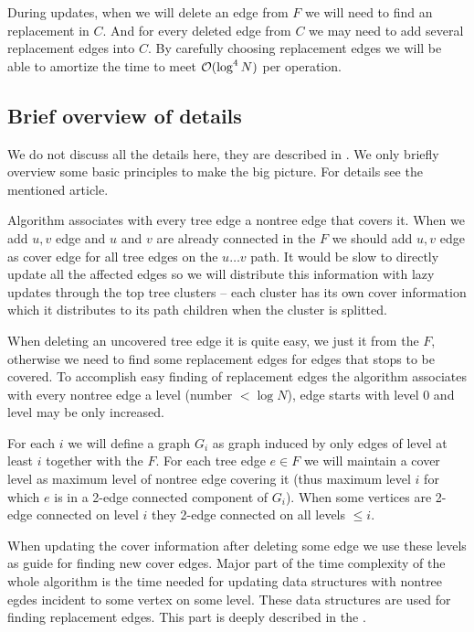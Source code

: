 During updates, when we will delete an edge from $F$ we will need to find an
replacement in $C$. And for every deleted edge from $C$ we may need to add
several replacement edges into $C$. By carefully choosing replacement
edges we will be able to amortize the time to meet ${\cal O}(\log^4 N)$ per operation.

\subsection{Brief overview of details}

We do not discuss all the details here, they are described in \cite{PolylogarithmicAlgorithmsForConnectivity}. We only briefly overview some basic
principles to make the big picture. For details see the mentioned article.

Algorithm associates with every tree edge a nontree edge that covers it. When we
add $u,v$ edge and $u$ and $v$ are already connected in the $F$ we should add
$u,v$ edge as cover edge for all tree edges on the $u\dots v$ path. It would be
slow to directly update all the affected edges so we will distribute this
information with lazy updates through the top tree clusters -- each cluster has
its own cover information which it distributes to its path children when the
cluster is splitted.

When deleting an uncovered tree edge it is quite easy, we just \Cut{} it from
the $F$, otherwise we need to find some replacement edges for edges that stops
to be covered. To accomplish easy finding of replacement edges the algorithm
associates with every nontree edge a level (number $< \log N$), edge starts with
level 0 and level may be only increased.

For each $i$ we will define a graph $G_i$ as graph induced by only edges of
level at least $i$ together with the $F$. For each tree edge $e \in F$ we will
maintain a cover level as maximum level of nontree edge covering it (thus
maximum level $i$ for which $e$ is in a 2-edge connected component of $G_i$).
When some vertices are 2-edge connected on level $i$ they 2-edge connected on
all levels $\le i$.

When updating the cover information after deleting some edge we use these levels
as guide for finding new cover edges. Major part of the time complexity of the
whole algorithm is the time needed for updating data structures with nontree
egdes incident to some vertex on some level. These data structures are used for
finding replacement edges. This part is deeply described in the \cite{PolylogarithmicAlgorithmsForConnectivity}.

